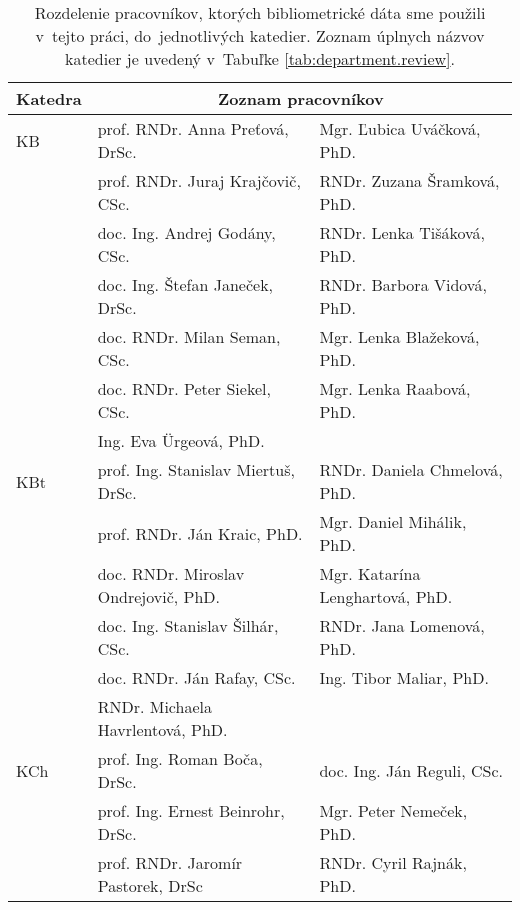 \begin{table}
  \centering\small
  \caption[Rozdelenie pracovníkov do jednotlivých katedier]%
  {Rozdelenie pracovníkov, ktorých bibliometrické dáta sme použili v~tejto
    práci, do~jednotlivých katedier. Zoznam úplnych názvov katedier je
    uvedený v~Tabuľke \ref{tab:department.review}.}
  \label{tab:staff.list}
  \begin{tabularx}{\textwidth}{lll}
    \toprule
    Katedra & \multicolumn{2}{c}{Zoznam pracovníkov} \\
    \midrule
    KB   & prof. RNDr. Anna Preťová, DrSc.            & Mgr. Ľubica Uváčková, PhD.        \\
         & prof. RNDr. Juraj Krajčovič, CSc.          & RNDr. Zuzana Šramková, PhD.       \\
         & doc. Ing. Andrej Godány, CSc.              & RNDr. Lenka Tišáková, PhD.        \\
         & doc. Ing. Štefan Janeček, DrSc.            & RNDr. Barbora Vidová, PhD.        \\
         & doc. RNDr. Milan Seman, CSc.               & Mgr. Lenka Blažeková, PhD.        \\
         & doc. RNDr. Peter Siekel, CSc.              & Mgr. Lenka Raabová, PhD.          \\
         & Ing. Eva Ürgeová, PhD.                     &                                   \\[2ex]
    KBt  & prof. Ing. Stanislav Miertuš, DrSc.        & RNDr. Daniela Chmelová, PhD.      \\
         & prof. RNDr. Ján Kraic, PhD.                & Mgr. Daniel Mihálik, PhD.         \\
         & doc. RNDr. Miroslav Ondrejovič, PhD.       & Mgr. Katarína Lenghartová, PhD.   \\
         & doc. Ing. Stanislav Šilhár, CSc.           & RNDr. Jana Lomenová, PhD.         \\
         & doc. RNDr. Ján Rafay, CSc.                 & Ing. Tibor Maliar, PhD.           \\
         & RNDr. Michaela Havrlentová, PhD.           &                                   \\[2ex]
    KCh  & prof. Ing. Roman Boča, DrSc.               & doc. Ing. Ján Reguli, CSc.        \\
         & prof. Ing. Ernest Beinrohr, DrSc.          & Mgr. Peter Nemeček, PhD.          \\
         & prof. RNDr. Jaromír Pastorek, DrSc         & RNDr. Cyril Rajnák, PhD.          \\

\end{tabularx}
\end{table}
